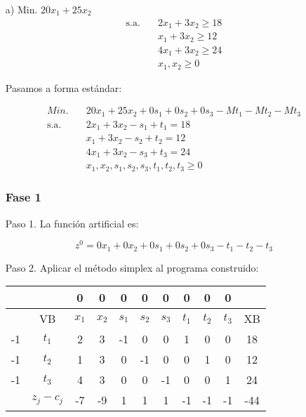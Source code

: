 \begin{itemize}
    \item[a)] Min. $20x_1 + 25x_2$
    \begin{align*}
        \text{s.a.} \quad & 2x_1 + 3x_2 \geq 18 \\
        & x_1 + 3x_2 \geq 12 \\
        & 4x_1 + 3x_2 \geq 24 \\
        & x_1, x_2 \geq 0
    \end{align*}

    Pasamos a forma estándar:

    \begin{align*}
        Min. \quad & 20x_1 + 25x_2 + 0s_1 + 0s_2 + 0s_3 - Mt_1 - Mt_2 - Mt_3\\
        \text{s.a.} \quad & 2x_1 + 3x_2 - s_1 + t_1= 18 \\
        & x_1 + 3x_2 - s_2 + t_2= 12 \\
        & 4x_1 + 3x_2 - s_3 + t_3= 24 \\
        & x_1, x_2, s_1, s_2, s_3, t_1, t_2, t_3 \geq 0
    \end{align*}

    \subsubsection*{Fase 1}

    Paso 1. La función artificial es:

    \begin{equation*}
        z^0=0x_1 + 0x_2 + 0s_1 + 0s_2 + 0s_3 -t_1 -t_2 -t_3
    \end{equation*}

    Paso 2. Aplicar el método simplex al programa construido:

    \begin{table}[H]
        \centering
        \begin{tabular}{|c|c|c|c|c|c|c|c|c|c|c|}
        \hline
        &  & 0 & 0 & 0 & 0 & 0 & 0 & 0 & 0 &\\
        \hline
        & VB & $x_1$ & $x_2$ & $s_1$ & $s_2$ & $s_3$ & $t_1$ & $t_2$ & $t_3$ & XB \\
        \hline
        -1 & $t_1$ & 2 & 3 & -1 & 0 & 0 & 1 & 0 & 0 & 18\\
        \hline
        -1 & $t_2$ & 1 & 3 & 0 & -1 & 0 & 0 & 1 & 0 & 12\\
        \hline
        -1 & $t_3$ & 4 & 3 & 0 & 0 & -1 & 0 & 0 & 1 & 24\\
        \hline
        & $z_j - c_j$ & -7& -9 & 1 & 1 & 1 & -1 & -1 & -1 &-44\\
        \hline
        \end{tabular}
    \end{table}


\end{itemize}
